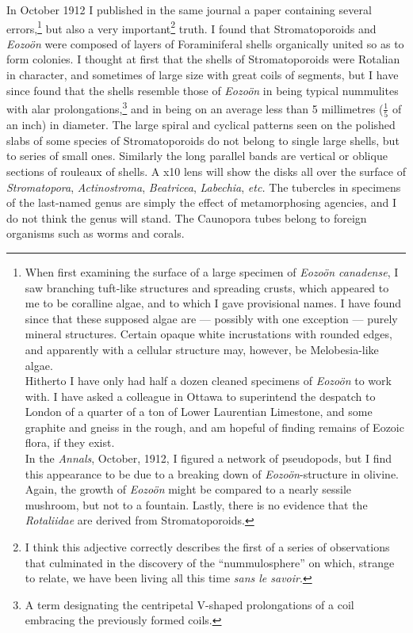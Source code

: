 \documentclass[a4paper, 12pt, oneside]{article}
\begin{document}
In October 1912 I published in the same journal a paper containing several errors,\footnote{When first examining the surface of a large specimen of \emph{Eozoön canadense}, I saw branching tuft-like structures and spreading crusts, which appeared to me to be coralline algae, and to which I gave provisional names. I have found since that these supposed algae are --- possibly with one exception --- purely mineral structures. Certain opaque white incrustations with rounded edges, and apparently with a cellular structure may, however, be Melobesia-like algae.\\ \hspace*{5mm}Hitherto I have only had half a dozen cleaned specimens of \emph{Eozoön} to work with. I have asked a colleague in Ottawa to superintend the despatch to London of a quarter of a ton of Lower Laurentian Limestone, and some graphite and gneiss in the rough, and am hopeful of finding remains of Eozoic flora, if they exist.\\ \hspace*{5mm}In the \emph{Annals}, October, 1912, I figured a network of pseudopods, but I find this appearance to be due to a breaking down of \emph{Eozoön}-structure in olivine. Again, the growth of \emph{Eozoön} might be compared to a nearly sessile mushroom, but not to a fountain. Lastly, there is no evidence that the \emph{Rotaliidae} are derived from Stromatoporoids.} but also a very important\footnote{I think this adjective correctly describes the first of a series of observations that culminated in the discovery of the ``nummulosphere'' on which, strange to relate, we have been living all this time \emph{sans le savoir}.} truth. I found that Stromatoporoids and \emph{Eozoön} were composed of layers of Foraminiferal shells organically united so as to form colonies. I thought at first that the shells of Stromatoporoids were Rotalian in character, and sometimes of large size with great coils of segments, but I have since found that the shells resemble those of \emph{Eozoön} in being typical nummulites with alar prolongations,\footnote{A term designating the centripetal V-shaped prolongations of a coil embracing the previously formed coils.} and in being on an average less than 5 millimetres ($\frac{1}{5}$  of an inch) in diameter. The large spiral and cyclical patterns seen on the polished slabs of some species of Stromatoporoids do not belong to single large shells, but to series of small ones. Similarly the long parallel bands are vertical or oblique sections of rouleaux of shells. A x10 lens will show the disks all over the surface of \emph{Stromatopora}, \emph{Actinostroma}, \emph{Beatricea}, \emph{Labechia}, \emph{etc.} The tubercles in specimens of the last-named genus are simply the effect of metamorphosing agencies, and I do not think the genus will stand. The Caunopora tubes belong to foreign organisms such as worms and corals.
\end{document}
